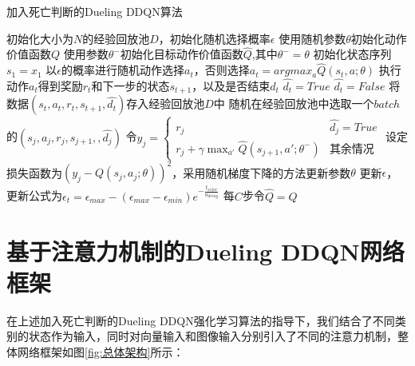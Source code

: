 \documentclass[letterpaper, 10 pt, conference]{ieeeconf}  %
\begin{document}
\begin{algorithm}[htbp]  
    \caption{加入死亡判断的Dueling DDQN算法}  
    \begin{algorithmic}[1] %
            \State 初始化大小为$N$的经验回放池$D$，初始化随机选择概率$\epsilon$
            \State 使用随机参数$\theta$初始化动作价值函数$Q$
            \State 使用参数$\theta^-$初始化目标动作价值函数$\hat{Q}$,其中$\theta^- = \theta$
                \State 初始化状态序列$s_1={x_1}$
                    \State 以$\epsilon$的概率进行随机动作选择$a_t$，否则选择$a_t = argmax_a \hat{Q}(s_t,a;\theta) $
                    \State 执行动作$a_t$得到奖励$r_t$和下一步的状态$s_{t+1}$，以及是否结束$d_t$
                        \State $\hat{d_t}=True$
                    \Else
                        \State $\hat{d_t}=False$
                    \EndIf
                    \State 将数据$(s_t,a_t,r_t,s_{t+1},\hat{d_t})$存入经验回放池$D$中
                    \State 随机在经验回放池中选取一个$batch$的$(s_j,a_j,r_j,s_{j+1},,\hat{d_j})$
                    \State 令$y_j = 
                    \begin{cases}
                        r_j      &  \hat{d_j}=True \\
                        r_j+\gamma \max_{a'} \hat{Q}(s_{j+1},a';\theta^-)   & \mbox{其余情况}
                      \end{cases}
                    $
                    \State 设定损失函数为$(y_j-Q(s_j,a_j;\theta))^2$，采用随机梯度下降的方法更新参数$\theta$
                    \State 更新$\epsilon$，更新公式为$\epsilon_t =\epsilon_{max} - (\epsilon_{max}-\epsilon_{min})e^{-\frac{t_{sofar}}{n_{decay}}}$
                    \State 每$C$步令$\hat{Q} = Q$
                \EndFor
            \EndFor
    \end{algorithmic}  
\end{algorithm} 


\section{基于注意力机制的Dueling DDQN网络框架}
在上述加入死亡判断的Dueling DDQN强化学习算法的指导下，我们结合了不同类别的状态作为输入，同时对向量输入和图像输入分别引入了不同的注意力机制，整体网络框架如图\ref{fig:总体架构}所示：
\end{document}
